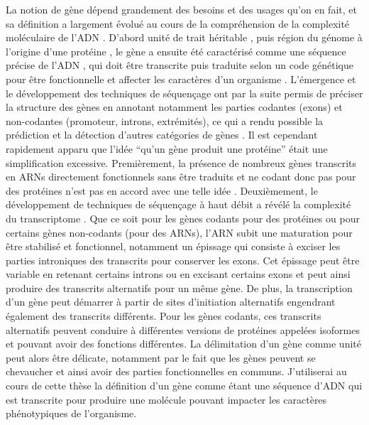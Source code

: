 La notion de gène dépend grandement des besoins et des usages qu’on en fait, et sa définition a largement évolué au cours de la compréhension de la complexité moléculaire de l’\acrshort{ADN} \citep{gerstein_what_2007}. D’abord unité de trait héritable \citep{mendel_verhandlungen_1866}, puis région du génome à l’origine d’une protéine \citep{morgan_mechanism_1915,beadle_genetic_1941}, le gène a ensuite été caractérisé comme une séquence précise de l’\acrshort{ADN} \citep{watson_molecular_1953}, qui doit être transcrite puis traduite selon un code génétique pour être fonctionnelle et affecter les caractères d’un organisme \citep{nirenberg_rna_1965}. L’émergence et le développement des techniques de séquençage ont par la suite permis de préciser la structure des gènes en annotant notamment les parties codantes (exons) et non-codantes (promoteur, introns, extrémités), ce qui a rendu possible la prédiction et la détection d’autres catégories de gènes \citep{fiers_complete_1976, doolittle_urfs_1986}. Il est cependant rapidement apparu que l’idée “qu’un gène produit une protéine” était une simplification excessive. Premièrement, la présence de nombreux gènes transcrits en \acrshort{ARN}s directement fonctionnels sans être traduits et ne codant donc pas pour des protéines n'est pas en accord avec une telle idée \citep{lander_initial_2001}. Deuxièmement, le développement de techniques de séquençage à haut débit a révélé la complexité du transcriptome \citep{birney_identification_2007, encode_project_consortium_integrated_2012}. Que ce soit pour les gènes codants pour des protéines ou pour certains gènes non-codants (pour des \acrshort{ARN}s), l’\acrshort{ARN} subit une maturation pour être stabilisé et fonctionnel, notamment un épissage qui consiste à exciser les parties introniques des transcrits pour conserver les exons. Cet épissage peut être variable en retenant certains introns ou en excisant certains exons et peut ainsi produire des transcrits alternatifs pour un même gène. De plus, la transcription d’un gène peut démarrer à partir de sites d’initiation alternatifs engendrant également des transcrits différents. Pour les gènes codants, ces transcrits alternatifs peuvent conduire à différentes versions de protéines appelées isoformes et pouvant avoir des fonctions différentes. La délimitation d’un gène comme unité peut alors être délicate, notamment par le fait que les gènes peuvent se chevaucher et ainsi avoir des parties fonctionnelles en communs. J’utiliserai au cours de cette thèse la définition d’un gène comme étant une séquence d’\acrshort{ADN} qui est transcrite pour produire une molécule pouvant impacter les caractères phénotypiques de l’organisme. \\


